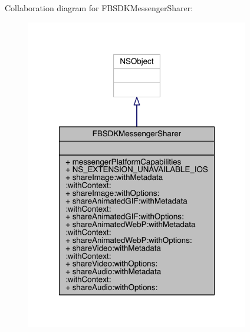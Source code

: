 Collaboration diagram for F\-B\-S\-D\-K\-Messenger\-Sharer\-:
\nopagebreak
\begin{figure}[H]
\begin{center}
\leavevmode
\includegraphics[width=276pt]{interface_f_b_s_d_k_messenger_sharer__coll__graph}
\end{center}
\end{figure}
